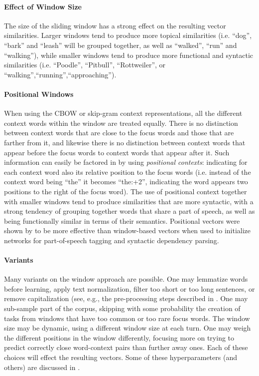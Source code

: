 \documentclass[jair,twoside,11pt,theapa]{article}
\begin{document}
{\paragraph{Effect of Window Size} The size of the sliding window has a strong
effect on the resulting vector similarities. Larger windows tend to produce more
topical similarities (i.e. ``dog'', ``bark'' and ``leash'' will be grouped
together, as well as ``walked'', ``run'' and ``walking''), while smaller windows
tend to produce more functional and syntactic similarities (i.e. ``Poodle'',
``Pitbull'', ``Rottweiler'', or ``walking'',``running'',``approaching'').

\paragraph{Positional Windows} When using the CBOW or skip-gram context
representations, all the different context words within the window are treated
equally. There is no distinction between context words that are close to the
focus words and those that are farther from it, and likewise there is no
distinction between context words that appear before the focus words to context
words that appear after it.  Such information can easily be factored in by using
\emph{positional contexts}: indicating for each context word also its relative
position to the focus words (i.e. instead of the context word being ``the'' it
becomes ``the:+2'', indicating the word appears two positions to the right of
the focus word). The use of positional context together with smaller windows
tend to produce similarities that are more syntactic, with a strong tendency of
grouping together words that share a part of speech, as well as being
functionally similar in terms of their semantics. Positional vectors were shown
by \cite{ling2015twotoo} to be more effective than window-based vectors when
used to initialize networks for part-of-speech tagging and syntactic dependency
parsing. 

\paragraph{Variants} Many variants on the window approach are possible. One may
lemmatize words before learning, apply text normalization, filter too short or
too long sentences, or remove capitalization (see, e.g., the pre-processing
steps described in \cite{dossantos2014deep}. One may sub-sample part of the corpus,
skipping with some probability the creation of tasks from windows that have too common or too rare
focus words. The window size may be dynamic, using a different window size at
each turn. One may weigh the different positions in the window differently,
focusing more on trying to predict correctly close word-context pairs than
further away ones.  Each of these choices will effect the resulting vectors.
Some of these hyperparameters (and others) are discussed in \cite{levy2015improving}.

}
\end{document}
